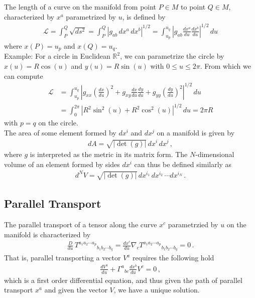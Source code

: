 \documentclass[11pt, onesided]{book}
\theoremstyle{break}
\theoremstyle{break}
\newcommand{\R}{\mathbb{R}}
\newcommand{\example}{\color{green}Example: \color{black}}
\begin{document}
The length of a curve on the manifold from point $P\in M$ to point $Q \in M$, characterized by $x^a$ parametrized by $u$, is defined by
\begin{align*}
\mathcal{L} =\int_P^Q \sqrt{ds^2} = \int_P^Q |g_{ab}\, dx^a\, dx^b|^{1/2} =\int_{u_p}^{u_q} \left| g_{ab} \frac{dx^a}{du}\frac{dx^b}{du}\right|^{1/2}\, du
\end{align*}
where $x(P) = u_p$ and $x(Q ) = u_q$.\\

\example For a circle in Euclidean $\R^2$, we can parametrize the circle by $x(u) = R\cos(u)$ and $y(u) = R\sin(u)$ with $0\leq u \leq 2\pi$. From which we can compute
\begin{align*}
\mathcal{L} 
&= \int_{u_p}^{u_q} \left| g_{xx}\left( \frac{dx}{du}\right)^2 + g_{xy} \frac{dx}{du}\frac{dy}{du}+ g_{yy}\left( \frac{dy}{du}\right)^2 \right|^{1/2} \, du \\
&= \int_{0}^{2\pi} \left| R^2 \sin^2(u) + R^2 \cos^2(u)\right|^{1/2} \, du = 2\pi R
\end{align*}
with $p = q$ on the circle. \\

The area of some element formed by $dx^i$ and $dx^j$ on a manifold is given by
\begin{align*}
dA = \sqrt{|\det(g)|}\, dx^i \, dx^j\,,
\end{align*}
where $g$ is interpreted as the metric in its matrix form. The $N$-dimensional volume of an element formed by sides $dx^i$ can thus be defined similarly as 
\begin{align*}
d^NV = \sqrt{|\det(g)|}\, dx^{i_1} \, dx^{i_2} \, \cdots dx^{i_N}\,.
\end{align*}

\subsection{Parallel Transport}
The parallel transport of a tensor along the curve $x^c$ parametrzied by $u$ on the manifold is characterized by
\begin{align*}
\frac{D}{du}\, T^{a_1a_2\cdots a_p}{}_{b_1b_2\cdots b_q}  = \frac{dx^c}{du}\nabla_c T^{a_1a_2\cdots a_p}{}_{b_1b_2\cdots b_q}  = 0\,.
\end{align*}
That is, parallel transporting a vector $V^a$ requires the following hold
\begin{align}
\frac{dV^a}{du} + \Gamma^{a}{}_{bc} \frac{dx^b}{du}V^c = 0\,,
\end{align}
which is a first order differential equation, and thus given the path of parallel transport $x^a$ and given the vector $V$, we have a unique solution.\\
\end{document}
